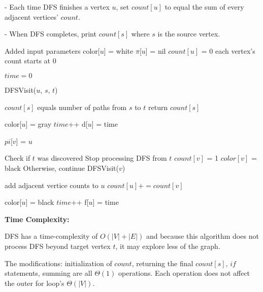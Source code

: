 \documentclass[a4paper]{report}
\begin{document}
\begin{enumerate}
      - Each time DFS finishes a vertex $u$, set $count[u]$ to equal the sum of every adjacent
      vertices' $count$.

      - When DFS completes, print $count[s]$ where $s$ is the source vertex.

    \begin{algorithmic}

      \Comment Added input parameters
        \State color[$u$] = white
        \State $\pi$[$u$] = nil
        \State $count[u]$ = 0 
      \Comment each vertex's count starts at 0

      \EndFor
      \State $time=0$


          \State DFSVisit($u$, $s$, $t$)
        \EndIf
      \EndFor

      \Comment $count[s]$ equals number of paths from $s$ to $t$
      \State return $count[s]$

    \EndFunction
    \end{algorithmic}

    \begin{algorithmic}
      \State color[$u$] = gray
      \State $time$++
      \State d[$u$] = time

          \State $pi$[$v$] = $u$


          \Comment Check if $t$ was discovered
            \Comment Stop processing DFS from $t$ 
            \State $count[v]$ = 1
            \State $color[v]$ = black
          \Else
            \Comment Otherwise, continue
            \State DFSVisit($v$)
          \EndIf
        \EndIf

        \Comment add adjacent vertice counts to $u$
        \State $count[u] += count[v]$
      \EndFor

      \State color[$u$] = black
      \State $time$++
      \State f[$u$] = time
    \EndFunction
    \end{algorithmic}

    {\bf Time Complexity:}

    DFS has a time-complexity of $O(|V| + |E|)$ and because this algorithm does not process DFS beyond target vertex $t$, it 
    may explore less of the graph. 

    The modifications: initialization of $count$, returning the final $count[s]$, $if$ statements, summing are all 
    $\Theta(1)$ operations. Each operation does not affect the outer for loop's $\Theta(|V|)$.


\end{enumerate}
\end{document}
